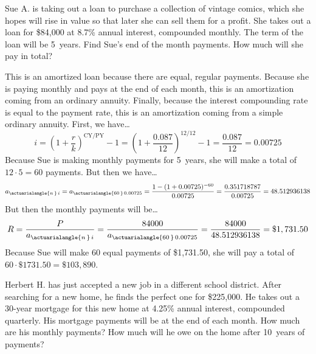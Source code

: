 \documentclass[11pt,letterpaper]{article}
\begin{document}

 Sue A. is taking out a loan to purchase a collection of vintage comics, which she hopes will rise in value so that later she can sell them for a profit. She takes out a loan for \$84,000 at 8.7\% annual interest, compounded monthly. The term of the loan will be 5~years. Find Sue's end of the month payments. How much will she pay in total? \pspace

\sol This is an amortized loan because there are equal, regular payments. Because she is paying monthly and pays at the end of each month, this is an amortization coming from an ordinary annuity. Finally, because the interest compounding rate is equal to the payment rate, this is an amortization coming from a simple ordinary annuity. First, we have\dots
	\[
	i= \left(1 + \dfrac{r}{k} \right)^{\text{CY}/\text{PY}} - 1= \left(1 + \dfrac{0.087}{12} \right)^{\text{12}/\text{12}} - 1= \dfrac{0.087}{12}= 0.00725
	\]
Because Sue is making monthly payments for 5~years, she will make a total of $12 \cdot 5= 60$ payments. But then we have\dots
	\[
	a_{\actuarialangle{n\,}\, i}= a_{\actuarialangle{60\,}\, 0.00725}= \dfrac{1 - (1 + 0.00725)^{-60}}{0.00725}= \dfrac{0.351718787}{0.00725}= 48.512936138 
	\]
But then the monthly payments will be\dots
	\[
	R= \dfrac{P}{a_{\actuarialangle{n\,}\, i}}= \dfrac{84000}{a_{\actuarialangle{60\,}\, 0.00725}}= \dfrac{84000}{48.512936138}= \$1,731.50
	\]
Because Sue will make 60 equal payments of \$1,731.50, she will pay a total of $60 \cdot \$1731.50= \$103,890$. 



\newpage



 Herbert H. has just accepted a new job in a different school district. After searching for a new home, he finds the perfect one for \$225,000. He takes out a 30-year mortgage for this new home at 4.25\% annual interest, compounded quarterly. His mortgage payments will be at the end of each month. How much are his monthly payments? How much will he owe on the home after 10~years of payments? \pspace
\end{document}

